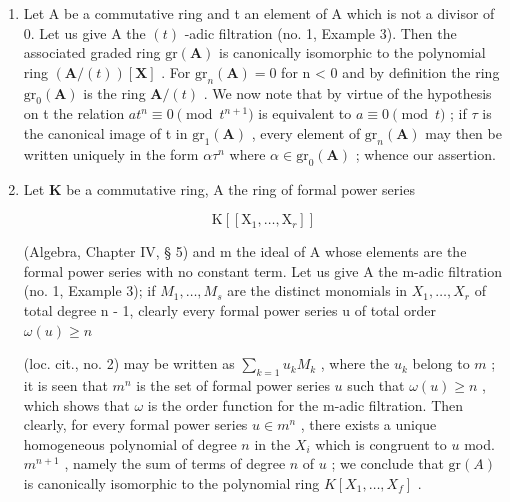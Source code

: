 \begin{enumerate}
\def\labelenumi{(\arabic{enumi})}
\item
  Let A be a commutative ring and t an element of A which is not a divisor of 0. Let us give A the \((t)\) -adic filtration (no. 1, Example 3). Then the associated graded ring \(\mathrm{gr}(\mathbf{A})\) is canonically isomorphic to the polynomial ring \((\mathbf{A}/(t))[\mathbf{X}]\) . For \(\mathrm{gr}_{n}(\mathbf{A}) = 0\) for n \textless{} 0 and by definition the ring \(\mathrm{gr}_{0}(\mathbf{A})\) is the ring \(\mathbf{A}/(t)\) . We now note that by virtue of the hypothesis on t the relation \(at^{n} \equiv 0 \pmod{t^{n+1}}\) is equivalent to \(a \equiv 0 \pmod{t}\) ; if \(\tau\) is the canonical image of t in \(\mathrm{gr}_{1}(\mathbf{A})\) , every element of \(\mathrm{gr}_{n}(\mathbf{A})\) may then be written uniquely in the form \(\alpha\tau^{n}\) where \(\alpha \in \mathrm{gr}_{0}(\mathbf{A})\) ; whence our assertion.
\item
  Let \(\mathbf{K}\) be a commutative ring, A the ring of formal power series

\[
\mathrm{K} \left[ \left[ \mathrm{X} _ {1}, \dots , \mathrm{X} _ {r} \right] \right]
\]

(Algebra, Chapter IV, § 5) and m the ideal of A whose elements are the formal power series with no constant term. Let us give A the m-adic filtration (no. 1, Example 3); if \(M_{1}, \ldots, M_{s}\) are the distinct monomials in \(X_{1}, \ldots, X_{r}\) of total degree n - 1, clearly every formal power series u of total order \(\omega(u) \geqslant n\)

(loc. cit., no. 2) may be written as \(\sum_{k=1} u_k M_k\) , where the \(u_k\) belong to \(m\) ; it is seen that \(m^n\) is the set of formal power series \(u\) such that \(\omega(u) \geqslant n\) , which shows that \(\omega\) is the order function for the m-adic filtration. Then clearly, for every formal power series \(u \in m^n\) , there exists a unique homogeneous polynomial of degree \(n\) in the \(X_i\) which is congruent to \(u\) mod. \(m^{n+1}\) , namely the sum of terms of degree \(n\) of \(u\) ; we conclude that \(\text{gr}(A)\) is canonically isomorphic to the polynomial ring \(K[X_1, \ldots, X_f]\) .


\end{enumerate}

